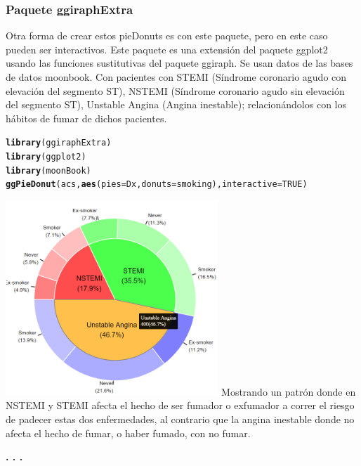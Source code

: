 \documentclass{article}\usepackage[]{graphicx}\usepackage[]{color}
\makeatletter
\newcommand{\hlnum}[1]{\textcolor[rgb]{0.686,0.059,0.569}{#1}}%
\newcommand{\hlstd}[1]{\textcolor[rgb]{0.345,0.345,0.345}{#1}}%
\newcommand{\hlkwc}[1]{\textcolor[rgb]{0.333,0.667,0.333}{#1}}%
\newcommand{\hlkwd}[1]{\textcolor[rgb]{0.737,0.353,0.396}{\textbf{#1}}}%
\newenvironment{kframe}{%
 \def\at@end@of@kframe{}%
 \ifinner\ifhmode%
  \def\at@end@of@kframe{\end{minipage}}%
  \begin{minipage}{\columnwidth}%
 \fi\fi%
 \def\FrameCommand##1{\hskip\@totalleftmargin \hskip-\fboxsep
 \colorbox{shadecolor}{##1}\hskip-\fboxsep
     \hskip-\linewidth \hskip-\@totalleftmargin \hskip\columnwidth}%
 \MakeFramed {\advance\hsize-\width
   \@totalleftmargin\z@ \linewidth\hsize
   \@setminipage}}%
 {\par\unskip\endMakeFramed%
 \at@end@of@kframe}
\newenvironment{knitrout}{}{} %
\makeatother
\begin{document}
\subsubsection{Paquete ggiraphExtra}
Otra forma de crear estos pieDonuts es con este paquete\cite{docu_ggiraphExtra}, pero en este caso pueden ser interactivos. Este paquete es una extensi\'on del paquete ggplot2\cite{docu_ggplot2} usando las funciones sustitutivas del paquete ggiraph\cite{docu_ggiraph}.
Se usan datos de las bases de datos moonbook. Con pacientes con STEMI (S\'indrome coronario agudo con elevaci\'on del segmento ST), NSTEMI (S\'indrome coronario agudo sin elevaci\'on del segmento ST), Unstable Angina (Angina inestable); relacion\'andolos con los h\'abitos de fumar de dichos pacientes.
\begin{knitrout}
\color{fgcolor}\begin{kframe}
\begin{alltt}
\hlkwd{library}\hlstd{(ggiraphExtra)}
\hlkwd{library}\hlstd{(ggplot2)}
\hlkwd{library}\hlstd{(moonBook)}
\hlkwd{ggPieDonut}\hlstd{(acs,}\hlkwd{aes}\hlstd{(}\hlkwc{pies}\hlstd{=Dx,}\hlkwc{donuts}\hlstd{=smoking),} \hlkwc{interactive} \hlstd{=} \hlnum{TRUE}\hlstd{)}
\end{alltt}
\end{kframe}
\end{knitrout}
\vbox{
    \centering
    \includegraphics[width=0.6\textwidth]{imag/pieDonut_inte}
}
Mostrando un patr\'on donde en NSTEMI y STEMI afecta el hecho de ser fumador o exfumador a correr el riesgo de padecer estas dos enfermedades, al contrario que la angina inestable donde no afecta el hecho de fumar, o haber fumado, con no fumar.
\begin{center}
\textbf{. . .}
\end{center}
\end{document}
